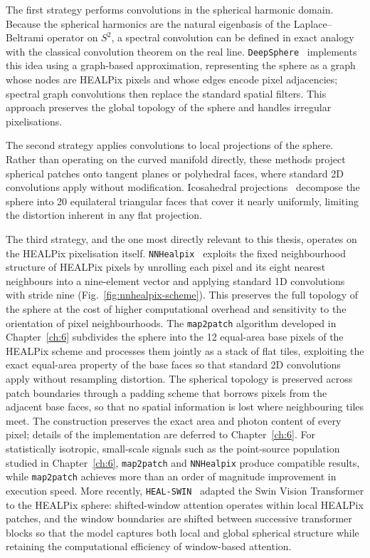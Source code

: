 The first strategy performs convolutions in the spherical harmonic domain.
Because the spherical harmonics are the natural eigenbasis of the Laplace--Beltrami operator on $S^2$, a spectral convolution can be defined in exact analogy with the classical convolution theorem on the real line.
\texttt{DeepSphere}~\cite{DBLP:journals/corr/abs-2012-15000} implements this idea using a graph-based approximation, representing the sphere as a graph whose nodes are HEALPix pixels and whose edges encode pixel adjacencies; spectral graph convolutions then replace the standard spatial filters.
This approach preserves the global topology of the sphere and handles irregular pixelisations.

The second strategy applies convolutions to local projections of the sphere.
Rather than operating on the curved manifold directly, these methods project spherical patches onto tangent planes or polyhedral faces, where standard 2D convolutions apply without modification.
Icosahedral projections~\cite{eder2019convolutions} decompose the sphere into 20 equilateral triangular faces that cover it nearly uniformly, limiting the distortion inherent in any flat projection.

The third strategy, and the one most directly relevant to this thesis, operates on the HEALPix pixelisation itself.
\texttt{NNHealpix}~\cite{Krachmalnicoff:2019} exploits the fixed neighbourhood structure of HEALPix pixels by unrolling each pixel and its eight nearest neighbours into a nine-element vector and applying standard 1D convolutions with stride nine (Fig.~\ref{fig:nnhealpix-scheme}).
This preserves the full topology of the sphere at the cost of higher computational overhead and sensitivity to the orientation of pixel neighbourhoods.
The \texttt{map2patch} algorithm developed in Chapter~\ref{ch:6} subdivides the sphere into the 12 equal-area base pixels of the HEALPix scheme and processes them jointly as a stack of flat tiles, exploiting the exact equal-area property of the base faces so that standard 2D convolutions apply without resampling distortion.
The spherical topology is preserved across patch boundaries through a padding scheme that borrows pixels from the adjacent base faces, so that no spatial information is lost where neighbouring tiles meet.
The construction preserves the exact area and photon content of every pixel; details of the implementation are deferred to Chapter~\ref{ch:6}.
For statistically isotropic, small-scale signals such as the point-source population studied in Chapter~\ref{ch:6}, \texttt{map2patch} and \texttt{NNHealpix} produce compatible results, while \texttt{map2patch} achieves more than an order of magnitude improvement in execution speed.
More recently, \texttt{HEAL-SWIN}~\cite{carlsson2024healswin} adapted the Swin Vision Transformer to the HEALPix sphere: shifted-window attention operates within local HEALPix patches, and the window boundaries are shifted between successive transformer blocks so that the model captures both local and global spherical structure while retaining the computational efficiency of window-based attention.

